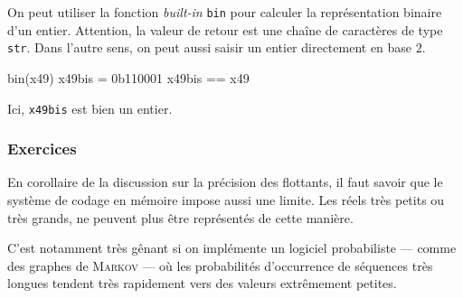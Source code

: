 
On peut utiliser la fonction \textit{built-in} \texttt{bin} pour calculer la représentation binaire d'un entier. Attention, la valeur de retour est une chaîne de caractères de type \texttt{str}. Dans l'autre sens, on peut aussi saisir un entier directement en base $2$.

\begin{idleconsole}
	\begin{pyconsole}
		bin(x49)
		x49bis = 0b110001
		x49bis == x49
	\end{pyconsole}
\end{idleconsole}

Ici, \texttt{x49bis} est bien un entier.


\subsubsection[Exercices]{Exercices}
\label{subsub:X.3.2.3}

En corollaire de la discussion sur la précision des flottants, il faut savoir que le système de codage en mémoire impose aussi une limite. Les réels très petits ou très grands, ne peuvent plus être représentés de cette manière.

C'est notamment très gênant si on implémente un logiciel probabiliste --- comme des graphes de \textsc{Markov} --- où les probabilités d'occurrence de séquences très longues tendent très rapidement vers des valeurs extrêmement petites.


